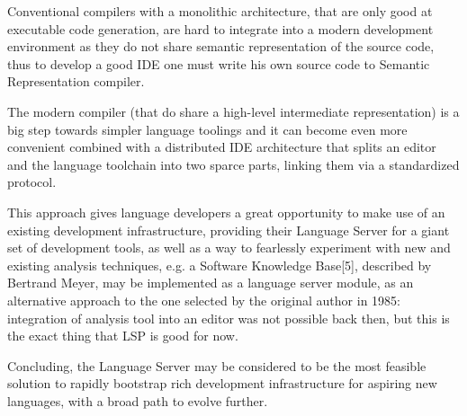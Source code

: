 Conventional compilers with a monolithic architecture, that are only good at executable code generation,
are hard to integrate into a modern development environment as they do not share 
semantic representation of the source code, thus to develop a good IDE one must write his own 
source code to Semantic Representation compiler.

The modern compiler (that do share a high-level intermediate representation) is
a big step towards simpler language toolings and it can become even more convenient
combined with a distributed IDE architecture that splits an editor and the language toolchain
into two sparce parts, linking them via a standardized protocol.

This approach gives language developers a great opportunity to make use of an
existing development infrastructure, providing their Language Server for a
giant set of development tools, as well as a way to fearlessly experiment with new and
existing analysis techniques, e.g. a Software Knowledge Base[5], described by
Bertrand Meyer, may be implemented as a language server module, as an
alternative approach to the one selected by the original author in 1985:
integration of analysis tool into an editor was not possible back then, but this is
the exact thing that LSP is good for now.

Concluding, the Language Server may be considered to be the most feasible
solution to rapidly bootstrap rich development infrastructure for aspiring new
languages, with a broad path to evolve further.
